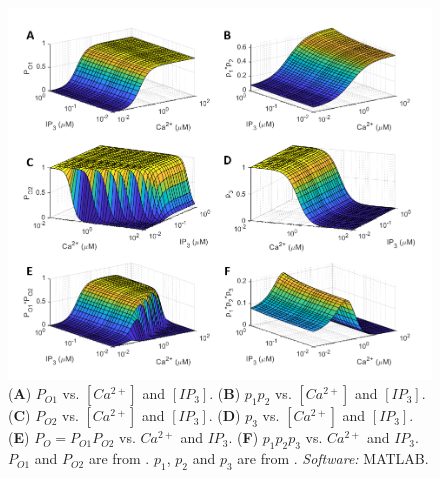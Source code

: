 \begin{figure}[h!!!t!!!b!!!p]
  \centering
  \includegraphics[width=1\linewidth]{Chapters/5_New_Model/extras/PARENTHCOMPARISONnew.png}
  \caption{(\textbf{A}) $P_{O1}$ vs. $[Ca^{2+}]$ and $[IP_3]$. (\textbf{B}) $p_1p_2$ vs. $[Ca^{2+}]$ and $[IP_3]$. (\textbf{C}) $P_{O2}$ vs. $[Ca^{2+}]$ and $[IP_3]$. (\textbf{D}) $p_3$ vs. $[Ca^{2+}]$ and $[IP_3]$. (\textbf{E}) $P_{O}=P_{O1}P_{O2}$ vs. $Ca^{2+}$ and $IP_3$. (\textbf{F}) $p_1p_2p_3$ vs. $Ca^{2+}$ and $IP_3$. $P_{O1}$ and $P_{O2}$ are from . $p_1$, $p_2$ and $p_3$ are from . \textit{Software:} MATLAB. }\label{parenthcomparison}
\end{figure}

